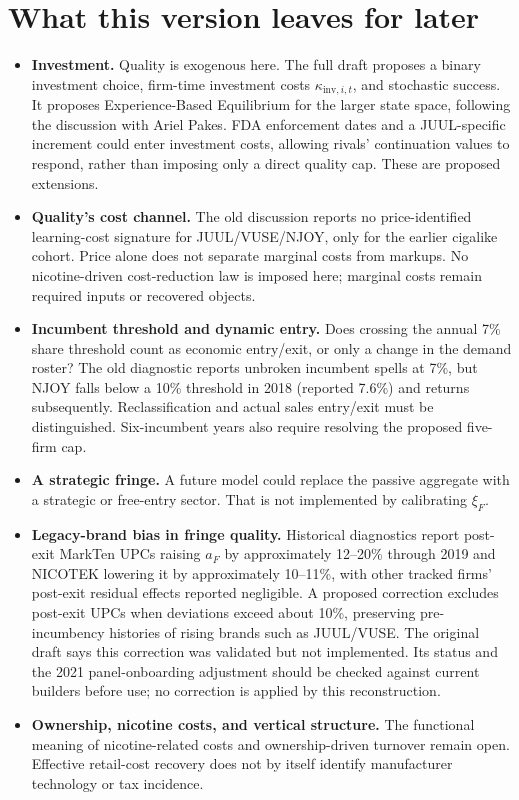 \documentclass[11pt]{article}
\begin{document}
\section{What this version leaves for later}
\begin{itemize}
\item \textbf{Investment.} Quality is exogenous here. The full draft proposes a binary investment choice, firm-time investment costs $\kappa_{\mathrm{inv},i,t}$, and stochastic success. It proposes Experience-Based Equilibrium for the larger state space, following the discussion with Ariel Pakes. FDA enforcement dates and a JUUL-specific increment could enter investment costs, allowing rivals' continuation values to respond, rather than imposing only a direct quality cap. These are proposed extensions.
\item \textbf{Quality's cost channel.} The old discussion reports no price-identified learning-cost signature for JUUL/VUSE/NJOY, only for the earlier cigalike cohort. Price alone does not separate marginal costs from markups. No nicotine-driven cost-reduction law is imposed here; marginal costs remain required inputs or recovered objects.
\item \textbf{Incumbent threshold and dynamic entry.} Does crossing the annual 7\% share threshold count as economic entry/exit, or only a change in the demand roster? The old diagnostic reports unbroken incumbent spells at 7\%, but NJOY falls below a 10\% threshold in 2018 (reported 7.6\%) and returns subsequently. Reclassification and actual sales entry/exit must be distinguished. Six-incumbent years also require resolving the proposed five-firm cap.
\item \textbf{A strategic fringe.} A future model could replace the passive aggregate with a strategic or free-entry sector. That is not implemented by calibrating $\xi_F$.
\item \textbf{Legacy-brand bias in fringe quality.} Historical diagnostics report post-exit MarkTen UPCs raising $a_F$ by approximately 12--20\% through 2019 and NICOTEK lowering it by approximately 10--11\%, with other tracked firms' post-exit residual effects reported negligible. A proposed correction excludes post-exit UPCs when deviations exceed about 10\%, preserving pre-incumbency histories of rising brands such as JUUL/VUSE. The original draft says this correction was validated but not implemented. Its status and the 2021 panel-onboarding adjustment should be checked against current builders before use; no correction is applied by this reconstruction.
\item \textbf{Ownership, nicotine costs, and vertical structure.} The functional meaning of nicotine-related costs and ownership-driven turnover remain open. Effective retail-cost recovery does not by itself identify manufacturer technology or tax incidence.
\end{itemize}
\end{document}
